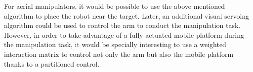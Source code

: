 For aerial manipulators, it would be possible to use the above mentioned algorithm to place the robot near the target. Later, an additional visual servoing algorithm could be used to control the arm to conduct the manipulation task. However, in order to take advantage of a fully actuated mobile platform during the manipulation task, it would be specially interesting to use a weighted interaction matrix \cite{santamaria-navarro_uncalibrated_2017} to control not only the arm but also the mobile platform thanks to a partitioned control.